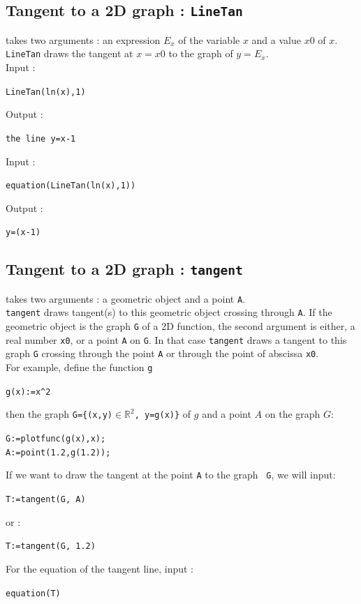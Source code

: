 \documentclass[a4paper,11pt]{book}
\newcommand{\R}{{\mathbb{R}}}
\begin{document}
\subsection{Tangent to a 2D graph : {\tt LineTan}}
 takes two arguments : an expression $E_x$ of the
variable $x$ and a value $x0$ of $x$.\\
 {\tt LineTan} draws the tangent at $x=x0$ to the graph of $y=E_x$.\\
Input :
\begin{center}{\tt LineTan(ln(x),1)}\end{center}
Output :
\begin{center}{\tt the line y=x-1}\end{center}
Input :
\begin{center}{\tt equation(LineTan(ln(x),1))}\end{center}
Output :
\begin{center}{\tt y=(x-1)}\end{center}

\subsection{Tangent to a 2D graph : {\tt tangent}}\label{sec:tangente}
 takes two arguments : a geometric object and a point 
{\tt A}.\\
{\tt tangent} draws tangent(s) to this geometric object crossing through 
{\tt A}. If the geometric object is the graph {\tt G} of a 2D function, 
the second argument is either, a real number {\tt x0}, or a 
point {\tt A} on {\tt G}. In that case {\tt tangent} draws a tangent to this
graph {\tt G} crossing through the point {\tt A} or through the 
point of abscissa {\tt x0}.\\
For example, define the function {\tt g}
\begin{center} \verb|g(x):=x^2|\end{center}
then the graph {\tt G=\{(x,y)$\in \R^2$, y=g(x)\}}
of $g$ and a point $A$ on the graph $G$:
\begin{center}
{\tt G:=plotfunc(g(x),x);}\\
{\tt A:=point(1.2,g(1.2));}
\end{center}
If we want to draw the tangent at the point {\tt A} to the graph {\tt
  G}, we will input:
\begin{center}
{\tt T:=tangent(G, A)}
\end{center}
or :
\begin{center}
{\tt T:=tangent(G, 1.2)}
\end{center}
For the equation of the tangent line, input :
\begin{center}{\tt equation(T)}\end{center}
\end{document}

